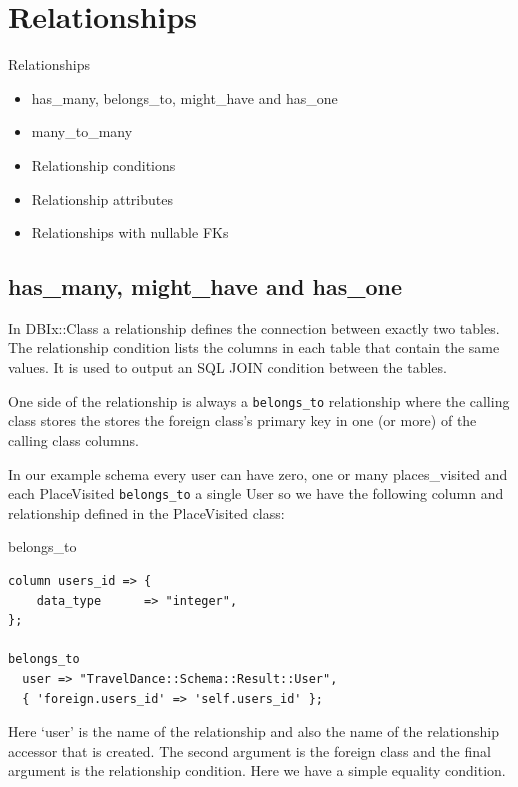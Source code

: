 \section{Relationships}

\begin{frame}{Relationships}
\begin{itemize}
\item has\_many, belongs\_to, might\_have and has\_one
\item many\_to\_many
\item Relationship conditions
\item Relationship attributes
\item Relationships with nullable FKs
\end{itemize}
\end{frame}

\subsection{has\_many, might\_have and has\_one}

In DBIx::Class a relationship defines the connection between exactly two
tables. The relationship condition lists the columns in each table that
contain the same values. It is used to output an SQL JOIN condition between
the tables.

One side of the relationship is always a \verb|belongs_to| relationship
where the calling class stores the stores the foreign class’s primary key in
one (or more) of the calling class columns.

In our example schema every user can have zero, one or many places\_visited and
each PlaceVisited \verb|belongs_to| a single User so we have the following column and
relationship defined in the PlaceVisited class: 
 
\begin{frame}[fragile]{belongs\_to}
\begin{lstlisting}
column users_id => {
    data_type      => "integer",
};

belongs_to
  user => "TravelDance::Schema::Result::User",
  { 'foreign.users_id' => 'self.users_id' };
\end{lstlisting}
\end{frame}

Here ‘user’ is the name of the relationship and also the name of the relationship accessor that is created. The second argument is the foreign class and the final argument is the relationship condition. Here we have a simple equality condition.

